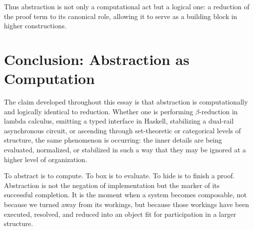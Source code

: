 \documentclass[11pt,letterpaper]{article}
\begin{document}
Thus abstraction is not only a computational act but a logical one: a reduction of the proof term to its canonical role, allowing it to serve as a building block in higher constructions.

\section{Conclusion: Abstraction as Computation}

The claim developed throughout this essay is that abstraction is computationally and logically identical to reduction. Whether one is performing $\beta$-reduction in lambda calculus, emitting a typed interface in Haskell, stabilizing a dual-rail asynchronous circuit, or ascending through set-theoretic or categorical levels of structure, the same phenomenon is occurring: the inner details are being evaluated, normalized, or stabilized in such a way that they may be ignored at a higher level of organization.

To abstract is to compute. To box is to evaluate. To hide is to finish a proof. Abstraction is not the negation of implementation but the marker of its successful completion. It is the moment when a system becomes composable, not because we turned away from its workings, but because those workings have been executed, resolved, and reduced into an object fit for participation in a larger structure.
\end{document}
